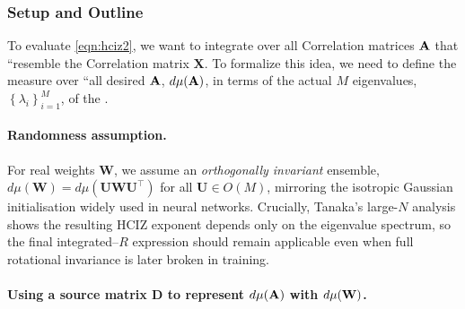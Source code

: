 \subsubsection{Setup and Outline}
\label{sxn:tanaka_setup}

\noindent
To evaluate \ref{eqn:hciz2},
we %
want to integrate over all \Student Correlation matrices $\mathbf{\mathbf{A}}$
that ``resemble the \Teacher Correlation matrix $\mathbf{X}$.  
To %
formalize this idea,
we need to %
define the measure over ``all desired $\mathbf{\mathbf{A}}$, $d\mu(\mathbf{\mathbf{A}})$, 
in 
terms of the actual $M$ eigenvalues, $\left\{ \lambda_{i} \right\}_{i=1}^{M}$, of the \Teacher.


\paragraph{Randomness assumption.}
For real weights $\mathbf{W}$,  we assume an \emph{orthogonally invariant} ensemble,
$d\mu(\mathbf W)=d\mu(\mathbf U\mathbf W\mathbf U^{\top})$ for all $\mathbf U\in O(M)$,
mirroring the isotropic Gaussian initialisation widely used in neural networks.
Crucially, Tanaka’s large-$N$ analysis shows the resulting HCIZ exponent depends only on the eigenvalue spectrum, so the final integrated–$R$ expression should remain applicable even when full rotational invariance is later broken in training.

\paragraph{Using a source matrix $\mathbf{D}$ to represent $d\mu(\mathbf{A})$ with $d\mu({\mathbf{W}})$.}

